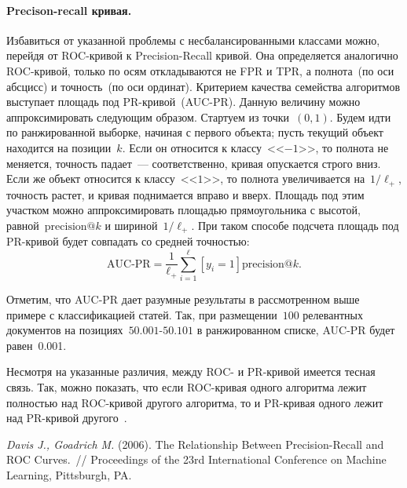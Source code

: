 \documentclass[12pt,fleqn]{article}
\begin{document}
\paragraph{Precison-recall кривая.}
Избавиться от указанной проблемы с несбалансированными классами можно,
перейдя от ROC-кривой к Precision-Recall кривой.
Она определяется аналогично ROC-кривой, только по осям
откладываются не FPR и TPR, а полнота~(по оси абсцисс) и точность~(по оси ординат).
Критерием качества семейства алгоритмов выступает площадь под PR-кривой~(AUC-PR).
Данную величину можно аппроксимировать следующим образом.
Стартуем из точки~$(0, 1)$.
Будем идти по ранжированной выборке, начиная с первого объекта;
пусть текущий объект находится на позиции~$k$.
Если он относится к классу~<<$-1$>>,
то полнота не меняется, точность падает~--- соответственно, кривая опускается строго вниз.
Если же объект относится к классу~<<$1$>>,
то полнота увеличивается на~$1/\ell_{+}$, точность растет, и кривая поднимается вправо и вверх.
Площадь под этим участком можно аппроксимировать площадью прямоугольника
с высотой, равной~$\text{precision}@k$ и шириной~$1/\ell_{+}$.
При таком способе подсчета площадь под PR-кривой будет совпадать со средней точностью:
\[
    \text{AUC-PR}
    =
    \frac{1}{\ell_{+}}
    \sum_{i = 1}^{\ell}
        [y_i = 1]
        \text{precision}@k.
\]

Отметим, что AUC-PR дает разумные результаты в рассмотренном выше примере с классификацией статей.
Так, при размещении~$100$ релевантных документов на позициях~$50.001$-$50.101$ в ранжированном списке,
AUC-PR будет равен~0.001.

Несмотря на указанные различия, между ROC- и PR-кривой имеется тесная связь.
Так, можно показать, что если ROC-кривая одного алгоритма лежит полностью над
ROC-кривой другого алгоритма, то и PR-кривая одного лежит над PR-кривой другого~\cite{davis06pr}.

\begin{thebibliography}{1}
    \emph{Davis J., Goadrich M.} (2006).
    The Relationship Between Precision-Recall and ROC Curves.~//
    Proceedings of the 23rd International Conference on Machine Learning, Pittsburgh, PA.
\end{thebibliography}
\end{document}
